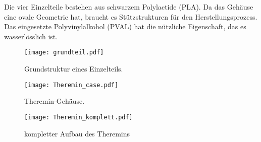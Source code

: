 Die vier Einzelteile bestehen aus schwarzem Polylactide (PLA). Da das Gehäuse eine ovale Geometrie hat, braucht es Stützstrukturen für den Herstellungsprozess. Das eingesetzte Polyvinylalkohol (PVAL) hat die nützliche Eigenschaft, das es wasserlösslich ist.
\begin{figure}[h]
	\centering
	\texttt{[image: grundteil.pdf]}
	\caption{Grundstruktur eines Einzelteils.}
	\label{img:grundteil}
\end{figure}
\begin{figure}[h]
	\centering
	\texttt{[image: Theremin\_case.pdf]}
	\caption{Theremin-Gehäuse.}
	\label{img:Theremin_case}
\end{figure}
\begin{figure}[h]
	\centering
	\texttt{[image: Theremin\_komplett.pdf]}
	\caption{kompletter Aufbau des Theremins}
	\label{img:Theremin_komplett}
\end{figure}




